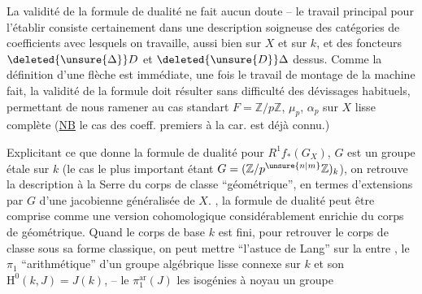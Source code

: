 La validité de la formule de dualité ne fait aucun doute -- le travail principal pour
l'établir consiste certainement dans une description soigneuse des catégories de coefficients avec lesquels on travaille, aussi bien sur $X$ et sur $k$, et des foncteurs $\deleted{\unsure{\Delta}}D$ et $\deleted{\unsure{D}}\Delta$ dessus. Comme la définition d'une flèche est immédiate, une fois le travail de montage de la machine fait, la validité de la formule doit résulter sans difficulté des dévissages habituels, permettant de nous ramener au cas standart $F=\mathbb{Z}/p\mathbb{Z}$, $\mu_p$, $\alpha_p$ sur $X$ lisse complète (\uline{NB} le cas des coeff. premiers à la car. est déjà connu.)

\noindent{}Explicitant ce que donne la formule de dualité pour $R^1f_*(G_X)$,  $G$ est un groupe  étale sur $k$ (le cas le plus important étant $G=(\mathbb{Z}/p^{\unsure{n|m}}\mathbb{Z})_k$), on retrouve la description à la Serre du corps de classe ``géométrique'', en termes d'extensions par $G$ d'une jacobienne généralisée de $X$. , la formule de dualité peut être comprise comme une version cohomologique considérablement enrichie du corps de  géométrique. Quand le corps de base $k$ est fini, pour retrouver le corps de classe sous sa forme classique, on peut mettre ``l'astuce de Lang'' sur la  entre , le $\pi_1$ ``arithmétique'' d'un groupe algébrique  lisse connexe  sur $k$ et son $\mathrm{H}^{0}(k,J)=J(k)$, -- le $\pi_1^{\mathrm{ar}}(J)$  les isogénies  à noyau un groupe 
